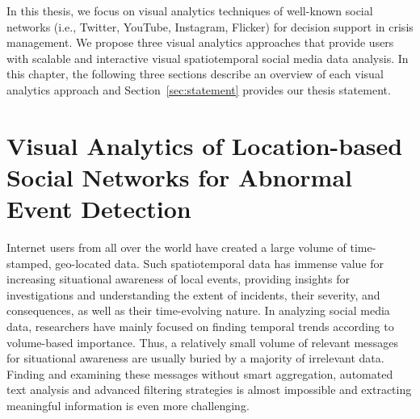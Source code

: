 In this thesis, we focus on visual analytics techniques of well-known social networks (i.e., Twitter, YouTube, Instagram, Flicker) for decision support in crisis management.
We propose three visual analytics approaches that provide users with scalable and interactive visual spatiotemporal social media data analysis.
In this chapter, the following three sections describe an overview of each visual analytics approach and Section~\ref{sec:statement} provides our thesis statement.


\section{Visual Analytics of Location-based Social Networks for Abnormal Event Detection}

Internet users from all over the world have created a large volume of time-stamped, geo-located data.
Such spatiotemporal data has immense value for increasing situational awareness of local events, 
providing insights for investigations and understanding the extent of incidents, their severity, and consequences, as well as their time-evolving nature.
In analyzing social media data, researchers have mainly focused on finding temporal trends according to volume-based importance.
Thus, a relatively small volume of relevant messages for situational awareness are usually buried by a majority of irrelevant data. 
Finding and examining these messages without smart aggregation, automated text analysis and advanced filtering strategies is almost impossible and extracting meaningful information is even more challenging.


